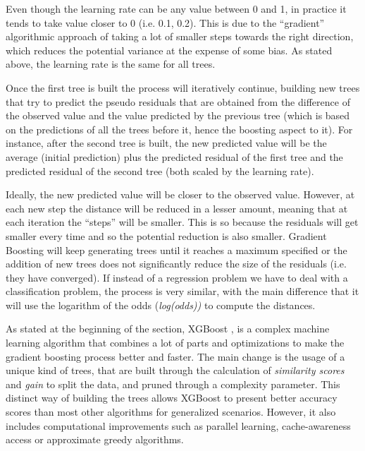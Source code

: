 \documentclass{article}
\begin{document}
Even though the learning rate can be any value between 0 and 1, in practice it tends to take value closer to 0 (i.e. 0.1, 0.2). This is due to the “gradient” algorithmic approach of taking a lot of smaller steps towards the right direction, which reduces the potential variance at the expense of some bias. As stated above, the learning rate is the same for all trees.

Once the first tree is built the process will iteratively continue, building new trees that try to predict the pseudo residuals that are obtained from the difference of the observed value and the value predicted by the previous tree (which is based on the predictions of all the trees before it, hence the boosting aspect to it). For instance, after the second tree is built, the new predicted value will be the average (initial prediction) plus the predicted residual of the first tree and the predicted residual of the second tree (both scaled by the learning rate).

Ideally, the new predicted value will be closer to the observed value. However, at each new step the distance will be reduced in a lesser amount, meaning that at each iteration the “steps” will be smaller. This is so because the residuals will get smaller every time and so the potential reduction is also smaller. Gradient Boosting will keep generating trees until it reaches a maximum specified or the addition of new trees does not significantly reduce the size of the residuals (i.e. they have converged). If instead of a regression problem we have to deal with a classification problem, the process is very similar, with the main difference that it will use the logarithm of the odds (\textit{log(odds))} to compute the distances.

As stated at the beginning of the section, XGBoost \textbf{\cite{datascience}}, \textbf{\cite{youtube3}} is a complex machine learning algorithm that combines a lot of parts and optimizations to make the gradient boosting process better and faster. The main change is the usage of a unique kind of trees, that are built through the calculation of \textit{similarity scores} and \textit{gain} to split the data, and pruned through a complexity parameter. This distinct way of building the trees allows XGBoost to present better accuracy scores than most other algorithms for generalized scenarios. However, it also includes computational improvements such as parallel learning, cache-awareness access or approximate greedy algorithms.
\end{document}

